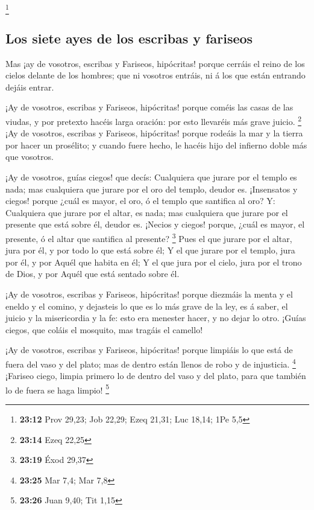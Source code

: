 \footnote{\textbf{23:12} Prov 29,23; Job 22,29; Ezeq 21,31; Luc 18,14;
  1Pe 5,5}

\hypertarget{los-siete-ayes-de-los-escribas-y-fariseos}{%
\subsection{Los siete ayes de los escribas y
fariseos}\label{los-siete-ayes-de-los-escribas-y-fariseos}}

 Mas ¡ay de vosotros, escribas y Fariseos, hipócritas!
porque cerráis el reino de los cielos delante de los hombres; que ni
vosotros entráis, ni á los que están entrando dejáis entrar.

 ¡Ay de vosotros, escribas y Fariseos, hipócritas! porque
coméis las casas de las viudas, y por pretexto hacéis larga oración: por
esto llevaréis más grave juicio. \footnote{\textbf{23:14} Ezeq 22,25}
 ¡Ay de vosotros, escribas y Fariseos, hipócritas! porque
rodeáis la mar y la tierra por hacer un prosélito; y cuando fuere hecho,
le hacéis hijo del infierno doble más que vosotros.

 ¡Ay de vosotros, guías ciegos! que decís: Cualquiera que
jurare por el templo es nada; mas cualquiera que jurare por el oro del
templo, deudor es.  ¡Insensatos y ciegos! porque ¿cuál es
mayor, el oro, ó el templo que santifica al oro?  Y:
Cualquiera que jurare por el altar, es nada; mas cualquiera que jurare
por el presente que está sobre él, deudor es.  ¡Necios y
ciegos! porque, ¿cuál es mayor, el presente, ó el altar que santifica al
presente? \footnote{\textbf{23:19} Éxod 29,37}  Pues el
que jurare por el altar, jura por él, y por todo lo que está sobre él;
 Y el que jurare por el templo, jura por él, y por Aquél
que habita en él;  Y el que jura por el cielo, jura por
el trono de Dios, y por Aquél que está sentado sobre él.

 ¡Ay de vosotros, escribas y Fariseos, hipócritas! porque
diezmáis la menta y el eneldo y el comino, y dejasteis lo que es lo más
grave de la ley, es á saber, el juicio y la misericordia y la fe: esto
era menester hacer, y no dejar lo otro.  ¡Guías ciegos,
que coláis el mosquito, mas tragáis el camello!

 ¡Ay de vosotros, escribas y Fariseos, hipócritas! porque
limpiáis lo que está de fuera del vaso y del plato; mas de dentro están
llenos de robo y de injusticia. \footnote{\textbf{23:25} Mar 7,4; Mar
  7,8}  ¡Fariseo ciego, limpia primero lo de dentro del
vaso y del plato, para que también lo de fuera se haga limpio!
\footnote{\textbf{23:26} Juan 9,40; Tit 1,15}

